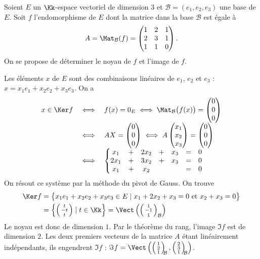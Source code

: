 \documentclass[class=report,crop=false]{standalone}
\begin{document}
\begin{exemple}
Soient $E$ un $\Kk$-espace vectoriel de dimension $3$
et $\mathcal{B}=(e_1,e_2,e_3)$ une base de
$E$. Soit $f$ l'endomorphisme de $E$ dont la matrice dans la base
$\mathcal{B}$ est égale à
$$A = \Mat_{\mathcal{B}} (f) =
\begin{pmatrix}
1&2&1\cr
2&3&1\cr
1&1&0\cr
\end{pmatrix}.$$
On se propose de déterminer le noyau de $f$ et l'image de $f$.


Les éléments $x$ de $E$ sont des combinaisons linéaires de
$e_1$, $e_2$ et $e_3$ : $x = x_1 e_1+x_2 e_2 + x_3 e_3$.
On a
$$\begin{array}{rcl}
x  \in \Ker f & \iff &
f(x)= 0_E \iff  \Mat_{\mathcal{B}} \big(f (x) \big) =
\begin{pmatrix}
0\cr
0\cr
0\end{pmatrix} \\
&\iff&
A X =
\begin{pmatrix}
0\cr
0\cr
0\end{pmatrix}
\iff
A
\begin{pmatrix}
x_1\cr
x_2\cr
x_3\end{pmatrix} =
 \begin{pmatrix}
0\cr
0\cr
0\end{pmatrix}\\
&\iff & \left \{
\begin{matrix}
x_1& +&2x_2&+&x_3&=&0\cr
2x_1& +&3x_2&+&x_3&=&0\cr
x_1&+&x_2&&&=&0\end{matrix}\right .
\end{array}$$
On résout ce système par la méthode du pivot de Gauss. On trouve
\begin{align*}
\Ker f&=\big\{x_1e_1+x_2e_2+x_3e_3 \in E \mid x_1 + 2x_2+x_3 = 0 \text{ et }
x_2+x_3=0\big\} \\
&=\left\{ \left(\begin{smallmatrix}t\\-t\\t\end{smallmatrix}\right) \mid t \in \Kk \right\}
= \Vect\left( \left(\begin{smallmatrix}1\\-1\\1\end{smallmatrix}\right)_{\mathcal{B}}\right)
\end{align*}
Le noyau est donc de dimension $1$. Par le théorème du rang, l'image $\Im f$ est de dimension $2$.
Les deux premiers vecteurs de la matrice $A$ étant linéairement indépendants, ils engendrent
$\Im f$ :
$\Im f = \Vect \left(
\left(\begin{smallmatrix}1\\2\\1\end{smallmatrix}\right)_{\!\!\mathcal{B}},
\left(\begin{smallmatrix}2\\3\\1\end{smallmatrix}\right)_{\!\!\mathcal{B}}
\right)$.
\end{exemple}
\end{document}
